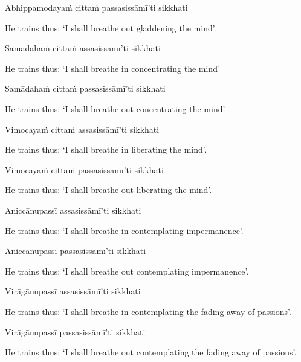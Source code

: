 Abhippamodayaṁ cittaṁ passasissāmī'ti sikkhati

\begin{english}
  He trains thus: `I shall breathe out gladdening the mind'.
\end{english}

Samādahaṁ cittaṁ assasissāmī'ti sikkhati

\begin{english}
  He trains thus: `I shall breathe in concentrating the mind'
\end{english}

Samādahaṁ cittaṁ passasissāmī'ti sikkhati

\begin{english}
  He trains thus: `I shall breathe out concentrating the mind'.
\end{english}

Vimocayaṁ cittaṁ assasissāmī'ti sikkhati

\begin{english}
  He trains thus: `I shall breathe in liberating the mind'.
\end{english}

Vimocayaṁ cittaṁ passasissāmī'ti sikkhati

\begin{english}
  He trains thus: `I shall breathe out liberating the mind'.
\end{english}

Aniccānupassī assasissāmī'ti sikkhati

\begin{english}
  He trains thus: `I shall breathe in contemplating impermanence'.
\end{english}

Aniccānupassī passasissāmī'ti sikkhati

\begin{english}
  He trains thus: `I shall breathe out contemplating impermanence'.
\end{english}

Virāgānupassī assasissāmī'ti sikkhati

\begin{english}
  He trains thus: `I shall breathe in contemplating the fading away of passions'.
\end{english}

Virāgānupassī passasissāmī'ti sikkhati

\begin{english}
  He trains thus: `I shall breathe out contemplating the fading away of passions'.
\end{english}

